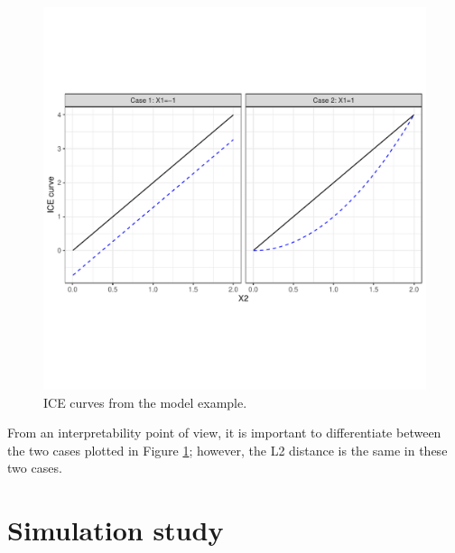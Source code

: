 \documentclass[smallextended,natbib]{svjour3}\usepackage[]{graphicx}\usepackage[]{xcolor}
\begin{document}
\begin{figure}[hbpt]
\centering
\includegraphics[trim=0cm 4cm 0cm 3cm, clip, scale=.7]{figures/fig-toyexample.pdf}
\caption{ICE curves from the model example. \label{iceej} }
\end{figure}
From an interpretability point of view, it is important to differentiate between the two cases plotted in Figure \ref{iceej}; however, the L2 distance is the same in these two cases. 

\section{Simulation study \label{simstudy}}
\end{document}
